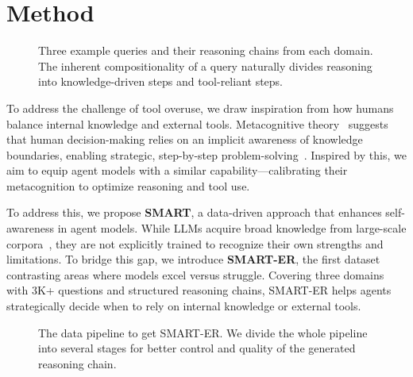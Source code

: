 \section{Method}

\begin{figure}[!t]
    \centering
    \caption{Three example queries and their reasoning chains from each domain. The inherent compositionality of a query naturally divides reasoning into knowledge-driven steps and tool-reliant steps.}
    \label{fig:intro_case}
\end{figure}

To address the challenge of tool overuse, we draw inspiration from how humans balance internal knowledge and external tools. Metacognitive theory~\citep{schraw1995metacognitive} suggests that human decision-making relies on an implicit awareness of knowledge boundaries, enabling strategic, step-by-step problem-solving~\citep{livingston2003metacognition}. Inspired by this, we aim to equip agent models with a similar capability—calibrating their metacognition to optimize reasoning and tool use.

To address this, we propose \textbf{SMART}, a data-driven approach that enhances self-awareness in agent models. While LLMs acquire broad knowledge from large-scale corpora~\citep{wang2022generalizing}, they are not explicitly trained to recognize their own strengths and limitations. To bridge this gap, we introduce \textbf{SMART-ER}, the first dataset contrasting areas where models excel versus struggle. Covering three domains with 3K+ questions and structured reasoning chains, SMART-ER helps agents strategically decide when to rely on internal knowledge or external tools.  

\begin{figure*}[!t]
    \centering
    \caption{The data pipeline to get SMART-ER. We divide the whole pipeline into several stages for better control and quality of the generated reasoning chain.}
    \label{fig:pipeline}
\end{figure*}


